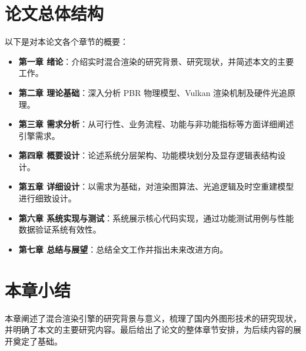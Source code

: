 \section{论文总体结构}
以下是对本论文各个章节的概要：
\begin{itemize}
    \item \textbf{第一章 绪论}：介绍实时混合渲染的研究背景、研究现状，并简述本文的主要工作。
    \item \textbf{第二章 理论基础}：深入分析 PBR 物理模型、Vulkan 渲染机制及硬件光追原理。
    \item \textbf{第三章 需求分析}：从可行性、业务流程、功能与非功能指标等方面详细阐述引擎需求。
    \item \textbf{第四章 概要设计}：论述系统分层架构、功能模块划分及显存逻辑表结构设计。
    \item \textbf{第五章 详细设计}：以需求为基础，对渲染图算法、光追逻辑及时空重建模型进行细致设计。
    \item \textbf{第六章 系统实现与测试}：系统展示核心代码实现，通过功能测试用例与性能数据验证系统有效性。
    \item \textbf{第七章 总结与展望}：总结全文工作并指出未来改进方向。
\end{itemize}

\section{本章小结}
本章阐述了混合渲染引擎的研究背景与意义，梳理了国内外图形技术的研究现状，并明确了本文的主要研究内容。最后给出了论文的整体章节安排，为后续内容的展开奠定了基础。
